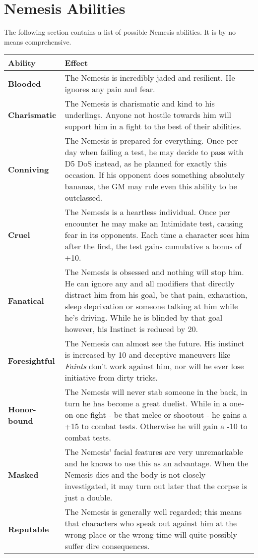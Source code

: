 \documentclass[12pt,a4paper,openany]{book}
\begin{document}
	\section*{Nemesis Abilities}
	The following section contains a list of possible Nemesis abilities. It is by no means comprehensive.
	{\setlength{\extrarowheight}{5pt}
	\begin{tabularx}{\textwidth}{l|X}
		Ability & Effect\\
		\hline
		\textbf{Blooded} & The Nemesis is incredibly jaded and resilient. He ignores any pain and fear.\\
		\hline
		\textbf{Charismatic} & The Nemesis is charismatic and kind to his underlings. Anyone not hostile towards him will support him in a fight to the best of their abilities.\\
		\hline
		\textbf{Conniving} & The Nemesis is prepared for everything. Once per day when failing a test, he may decide to pass with D5 DoS instead, as he planned for exactly this occasion. If his opponent does something absolutely bananas, the GM may rule even this ability to be outclassed.\\
		\hline
		\textbf{Cruel} & The Nemesis is a heartless individual. Once per encounter he may make an Intimidate test, causing fear in its opponents. Each time a character sees him after the first, the test gains cumulative a bonus of +10.\\
		\hline
		\textbf{Fanatical} & The Nemesis is obsessed and nothing will stop him. He can ignore any and all modifiers that directly distract him from his goal, be that pain, exhaustion, sleep deprivation or someone talking at him while he's driving. While he is blinded by that goal however, his Instinct is reduced by 20.\\
		\hline
		\textbf{Foresightful} & The Nemesis can almost see the future. His instinct is increased by 10 and deceptive maneuvers like \emph{Faints} don't work against him, nor will he ever lose initiative from dirty tricks.\\
		\hline
		\textbf{Honor-bound} & The Nemesis will never stab someone in the back, in turn he has become a great duelist. While in a one-on-one fight - be that melee or shootout - he gains a +15 to combat tests. Otherwise he will gain a -10 to combat tests.\\
		\hline
		\textbf{Masked} & The Nemesis' facial features are very unremarkable and he knows to use this as an advantage. When the Nemesis dies and the body is not closely investigated, it may turn out later that the corpse is just a double.\\
		\hline
		\textbf{Reputable} & The Nemesis is generally well regarded; this means that characters who speak out against him at the wrong place or the wrong time will quite possibly suffer dire consequences.
	\end{tabularx}}
\end{document}
